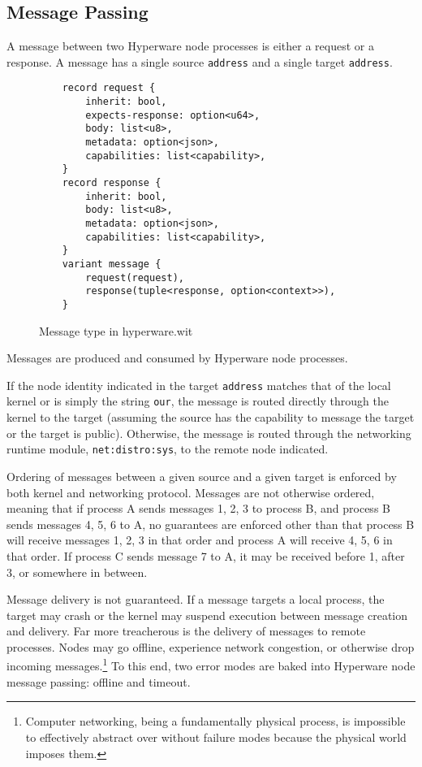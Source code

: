 \documentclass[runningheads]{llncs}
\begin{document}
\subsection{Message Passing}
\label{sec:osmessagepassing}

A message between two Hyperware node processes is either a request or a response.
A message has a single source \verb|address| and a single target \verb|address|.

\begin{figure}[H]
    \centering
    \begin{verbatim}
    record request {
        inherit: bool,
        expects-response: option<u64>,
        body: list<u8>,
        metadata: option<json>,
        capabilities: list<capability>,
    }
    record response {
        inherit: bool,
        body: list<u8>,
        metadata: option<json>,
        capabilities: list<capability>,
    }
    variant message {
        request(request),
        response(tuple<response, option<context>>),
    }
    \end{verbatim}
    \caption{Message type in hyperware.wit}
    \label{fig:WIT Types 2}
\end{figure}

Messages are produced and consumed by Hyperware node processes.

If the node identity indicated in the target \verb|address| matches that of the local kernel or is simply the string \verb|our|, the message is routed directly through the kernel to the target (assuming the source has the capability to message the target or the target is public).
Otherwise, the message is routed through the networking runtime module, \verb|net:distro:sys|, to the remote node indicated.

Ordering of messages between a given source and a given target is enforced by both kernel and networking protocol.
Messages are not otherwise ordered, meaning that if process A sends messages 1, 2, 3 to process B, and process B sends messages 4, 5, 6 to A, no guarantees are enforced other than that process B will receive messages 1, 2, 3 in that order and process A will receive 4, 5, 6 in that order.
If process C sends message 7 to A, it may be received before 1, after 3, or somewhere in between.

Message delivery is not guaranteed.
If a message targets a local process, the target may crash or the kernel may suspend execution between message creation and delivery.
Far more treacherous is the delivery of messages to remote processes.
Nodes may go offline, experience network congestion, or otherwise drop incoming messages.\footnote{Computer networking, being a fundamentally physical process, is impossible to effectively abstract over without failure modes because the physical world imposes them.}
To this end, two error modes are baked into Hyperware node message passing: offline and timeout.
\end{document}
